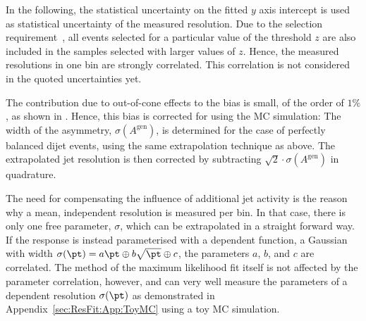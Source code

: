 In the following, the statistical uncertainty on the fitted $y$ axis
intercept is used as statistical uncertainty of the measured resolution.
Due to the selection requirement~,
all events selected for a particular value of the threshold $z$ are
also included in the samples selected with larger values of $z$.
Hence, the measured resolutions in one \ptave bin are strongly correlated.
This correlation is not considered in the quoted uncertainties yet.

The contribution due to out-of-cone effects to the bias is small, of
the order of $1\%$, as shown in
.
Hence, this bias is corrected for using the MC simulation:
The width of the \ptgen asymmetry, $\sigma(A^{\text{gen}})$, is determined for the
 case of perfectly balanced dijet events, using the
same extrapolation technique as above.
The extrapolated jet \pt resolution is then corrected by 
subtracting $\sqrt{2}\cdot\sigma(A^{\text{gen}})$ in quadrature.

The need for compensating the influence of additional jet activity is
the reason why a mean, \pt independent resolution is
measured per \ptave bin.
In that case, there is only one free parameter, $\sigma$, which can be
extrapolated in a straight forward way.
If the response is instead parameterised with a \pt dependent function,
\eg a Gaussian with width \mbox{$\sigma(\pt) = a\pt \oplus
  b\sqrt{\pt} \oplus c$},
the parameters $a$, $b$, and $c$ are correlated.
The method of the maximum likelihood fit itself is not affected by the
parameter correlation, however, and can very well measure the
parameters of a \pt dependent resolution $\sigma(\pt)$ as demonstrated
in Appendix~\ref{sec:ResFit:App:ToyMC} using a toy MC simulation.

